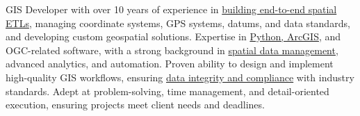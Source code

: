 \documentclass[letterpaper]{article}
\newcommand{\impt}[1]{\uline{#1}}
\begin{document}
{%

GIS Developer with over 10 years of experience in \impt{building end-to-end spatial ETLs}, 
managing coordinate systems, GPS systems, datums, and data standards, and developing custom geospatial solutions. 
Expertise in \impt{Python, ArcGIS}, and OGC-related software, with a strong background in \impt{spatial data management},
advanced analytics, and automation. 
Proven ability to design and implement high-quality GIS workflows, ensuring \impt{data integrity and compliance} 
with industry standards. 
Adept at problem-solving, time management, and detail-oriented execution, ensuring projects meet client needs and deadlines.

}
\end{document}
